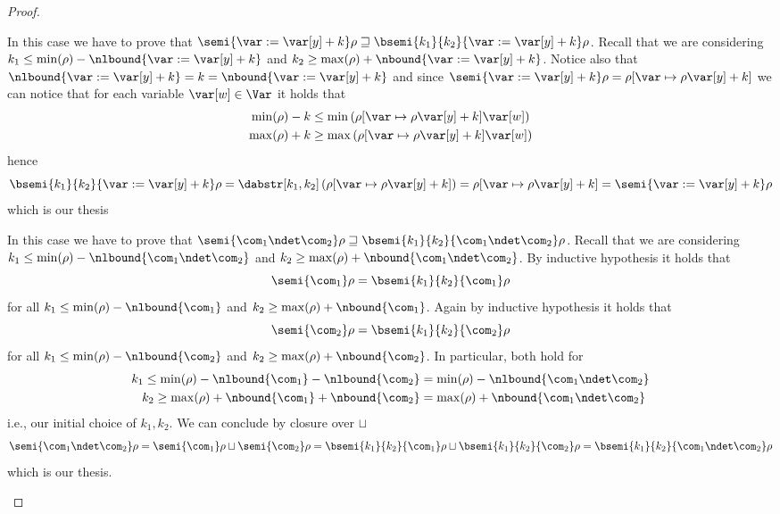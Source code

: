 \begin{proof}
\begin{inductive}
     In this case we have to prove that
    \(\semi{\var := \var[y] + k}\rho \sqsupseteq
    \bsemi{k_1}{k_2}{\var:=\var[y]+k}\rho\).  Recall that we
    are considering
    \({k_1 \leq \min(\rho) - \nlbound{\var:=\var[y]+k}}\) and
    \({k_2 \geq \max(\rho) + \nbound{\var:=\var[y]+k}}\). Notice also
    that
    \(\nlbound{\var := \var[y]+k} = k = \nbound{\var := \var[y] + k}\)
    and since
    \(\semi{\var:= \var[y] + k}\rho = \rho[\var \mapsto
    \rho\var[y] + k]\) we can notice that for each variable
    \(\var[w] \in \Var\) it holds that
    \begin{align*}
      \min(\rho) - k & \leq \min\left(\rho[\var \mapsto \rho\var[y] + k] \var[w]\right) \\
      \max(\rho) + k & \geq \max\left(\rho[\var \mapsto \rho\var[y] + k] \var[w]\right)
    \end{align*}
    hence
    \begin{equation*}
      \bsemi{k_1}{k_2}{\var := \var[y] + k}\rho = \dabstr[k_1,k_2]\left(\rho[\var \mapsto \rho\var[y] + k]\right) = \rho[\var \mapsto \rho\var[y] + k] = \semi{\var := \var[y] + k}\rho
    \end{equation*}
    which is our thesis
    
     In this case we have to prove that
    \(\semi{\com_1 \ndet \com_2}\rho \sqsupseteq
    \bsemi{k_1}{k_2}{\com_1 \ndet \com_2}\rho\). Recall that we
    are considering
    \(k_1 \leq \min(\rho) - \nlbound{\com_1 \ndet \com_2}\) and
    \(k_2 \geq \max(\rho) + \nbound{\com_1 \ndet \com_2}\).  By
    inductive hypothesis it holds that
    \begin{equation*}
      \semi{\com_1}\rho = \bsemi{k_1}{k_2}{\com_1}\rho
    \end{equation*}
    for all \(k_1 \leq \min(\rho) - \nlbound{\com_1}\) and
    \(k_2 \geq \max(\rho) + \nbound{\com_1}\). Again by inductive
    hypothesis it holds that
    \begin{equation*}
      \semi{\com_2}\rho = \bsemi{k_1}{k_2}{\com_2}\rho
    \end{equation*}
    for all \(k_1 \leq \min(\rho) - \nlbound{\com_2}\) and
    \(k_2 \geq \max(\rho) + \nbound{\com_2}\). In particular, both hold
    for
    \begin{align*}
      {k_1} \leq {\min(\rho) - \nlbound{\com_1} - \nlbound{\com_2}} & = {\min(\rho) - \nlbound{\com_1 \ndet \com_2}} \\
      {k_2} \geq {\max(\rho) + \nbound{\com_1} + \nbound{\com_2}} & = {\max(\rho) + \nbound{\com_1 \ndet \com_2}}
    \end{align*}
    i.e., our initial choice of \(k_1, k_2\). We can conclude by
    closure over \(\sqcup\)
    \begin{equation*}
      \semi{\com_1 \ndet \com_2}\rho = \semi{\com_1}\rho \sqcup \semi{\com_2}\rho = \bsemi{k_1}{k_2}{\com_1}\rho \sqcup \bsemi{k_1}{k_2}{\com_2}\rho = \bsemi{k_1}{k_2}{\com_1\ndet\com_2}\rho
    \end{equation*}
    which is our thesis.


\end{inductive}
\end{proof}
